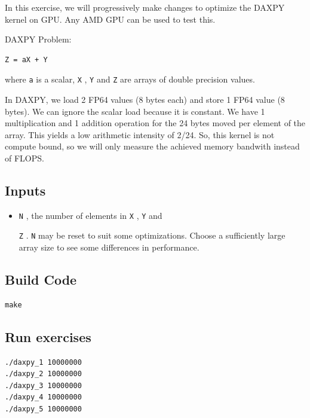 \documentclass[
]{article}
\providecommand{\tightlist}{%
  \setlength{\itemsep}{0pt}\setlength{\parskip}{0pt}}
\let\oldtexttt\texttt
\renewcommand{\texttt}[1]{
  \colorbox{Light}{\oldtexttt{#1}}
}
\providecommand{\tightlist}{%
  \setlength{\itemsep}{0pt}\setlength{\parskip}{0pt}}
\begin{document}
In this exercise, we will progressively make changes to optimize the
DAXPY kernel on GPU. Any AMD GPU can be used to test this.

DAXPY Problem:

\begin{verbatim}
Z = aX + Y
\end{verbatim}

where \texttt{a} is a scalar, \texttt{X}, \texttt{Y} and \texttt{Z} are
arrays of double precision values.

In DAXPY, we load 2 FP64 values (8 bytes each) and store 1 FP64 value (8
bytes). We can ignore the scalar load because it is constant. We have 1
multiplication and 1 addition operation for the 24 bytes moved per
element of the array. This yields a low arithmetic intensity of 2/24.
So, this kernel is not compute bound, so we will only measure the
achieved memory bandwith instead of FLOPS.

\hypertarget{inputs}{%
\subsection{Inputs}\label{inputs}}

\begin{itemize}
\tightlist
\item
  \texttt{N}, the number of elements in \texttt{X}, \texttt{Y} and
  \texttt{Z}. \texttt{N} may be reset to suit some optimizations. Choose
  a sufficiently large array size to see some differences in
  performance.
\end{itemize}

\hypertarget{build-code}{%
\subsection{Build Code}\label{build-code}}

\begin{verbatim}
make
\end{verbatim}

\hypertarget{run-exercises}{%
\subsection{Run exercises}\label{run-exercises}}

\begin{verbatim}
./daxpy_1 10000000
./daxpy_2 10000000
./daxpy_3 10000000
./daxpy_4 10000000
./daxpy_5 10000000
\end{verbatim}
\end{document}
